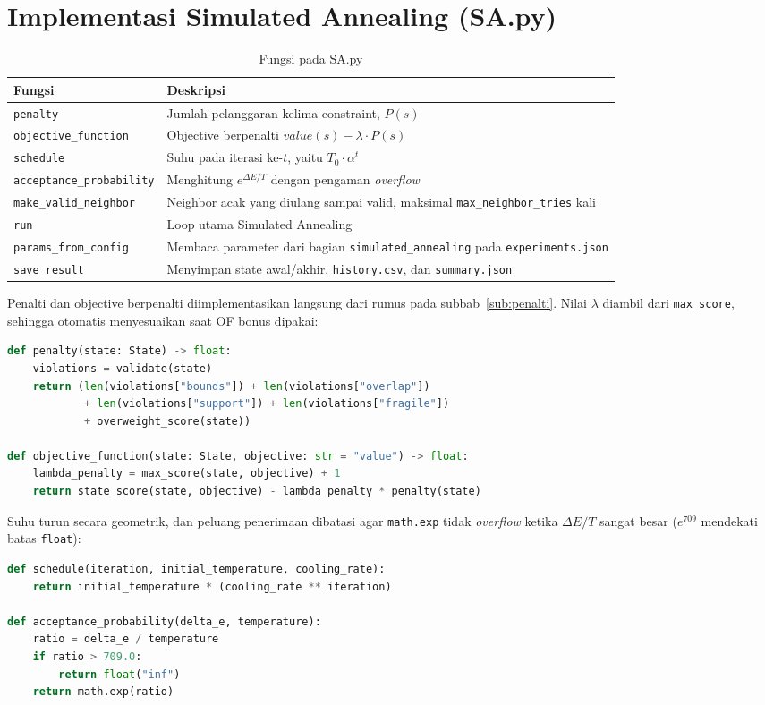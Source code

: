 \documentclass[12pt,a4paper]{report}
\newcommand{\hd}[1]{\cellcolor{hdr}\textbf{#1}}
\newcommand{\code}[1]{\texttt{\small #1}}
\begin{document}
\section{Implementasi Simulated Annealing (SA.py)}
\begin{table}[H]
\centering
\caption{Fungsi pada SA.py}
\small
\begin{tabular}{|L{4.6cm}|L{8.6cm}|}
\hline
\hd{Fungsi} & \hd{Deskripsi} \\ \hline
\code{penalty} & Jumlah pelanggaran kelima constraint, $P(s)$ \\ \hline
\code{objective\_function} & Objective berpenalti $value(s) - \lambda \cdot P(s)$ \\ \hline
\code{schedule} & Suhu pada iterasi ke-$t$, yaitu $T_0 \cdot \alpha^t$ \\ \hline
\code{acceptance\_probability} & Menghitung $e^{\Delta E/T}$ dengan pengaman \textit{overflow} \\ \hline
\code{make\_valid\_neighbor} & Neighbor acak yang diulang sampai valid, maksimal \code{max\_neighbor\_tries} kali \\ \hline
\code{run} & Loop utama Simulated Annealing \\ \hline
\code{params\_from\_config} & Membaca parameter dari bagian \code{simulated\_annealing} pada \code{experiments.json} \\ \hline
\code{save\_result} & Menyimpan state awal/akhir, \code{history.csv}, dan \code{summary.json} \\ \hline
\end{tabular}
\end{table}

Penalti dan objective berpenalti diimplementasikan langsung dari rumus pada subbab~\ref{sub:penalti}.
Nilai $\lambda$ diambil dari \code{max\_score}, sehingga otomatis menyesuaikan saat OF bonus dipakai:
\begin{lstlisting}[language=Python]
def penalty(state: State) -> float:
    violations = validate(state)
    return (len(violations["bounds"]) + len(violations["overlap"])
            + len(violations["support"]) + len(violations["fragile"])
            + overweight_score(state))

def objective_function(state: State, objective: str = "value") -> float:
    lambda_penalty = max_score(state, objective) + 1
    return state_score(state, objective) - lambda_penalty * penalty(state)
\end{lstlisting}

Suhu turun secara geometrik, dan peluang penerimaan dibatasi agar \code{math.exp} tidak
\textit{overflow} ketika $\Delta E/T$ sangat besar ($e^{709}$ mendekati batas \code{float}):
\begin{lstlisting}[language=Python]
def schedule(iteration, initial_temperature, cooling_rate):
    return initial_temperature * (cooling_rate ** iteration)

def acceptance_probability(delta_e, temperature):
    ratio = delta_e / temperature
    if ratio > 709.0:
        return float("inf")
    return math.exp(ratio)
\end{lstlisting}
\end{document}
